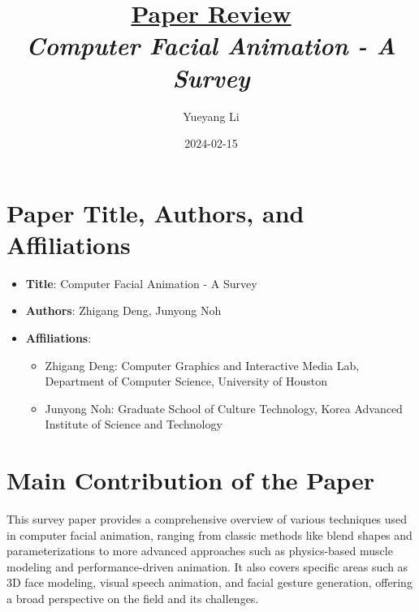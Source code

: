 \documentclass[12pt]{article}
\newcommand{\paperTitle}{
    \textit{\normalsize{Computer Facial Animation - A Survey}}
}
\begin{document}
\title{\Large\uline{\textbf{Paper Review}} \\[0.4em]
\paperTitle{} 
}
\author{Yueyang Li}
\date{2024-02-15}

\maketitle

\section{Paper Title, Authors, and Affiliations}
\begin{itemize}[noitemsep]
    \item \textbf{Title}: Computer Facial Animation - A Survey
    \item \textbf{Authors}: Zhigang Deng, Junyong Noh
    \item \textbf{Affiliations}:
    \begin{itemize}[noitemsep]
        \item Zhigang Deng: Computer Graphics and Interactive Media Lab, Department of Computer Science, University of Houston
        \item Junyong Noh: Graduate School of Culture Technology, Korea Advanced Institute of Science and Technology
    \end{itemize}
\end{itemize}

\section{Main Contribution of the Paper}
This survey paper provides a comprehensive overview of various techniques used in computer facial animation, ranging from classic methods like blend shapes and parameterizations to more advanced approaches such as physics-based muscle modeling and performance-driven animation. It also covers specific areas such as 3D face modeling, visual speech animation, and facial gesture generation, offering a broad perspective on the field and its challenges.
\end{document}
